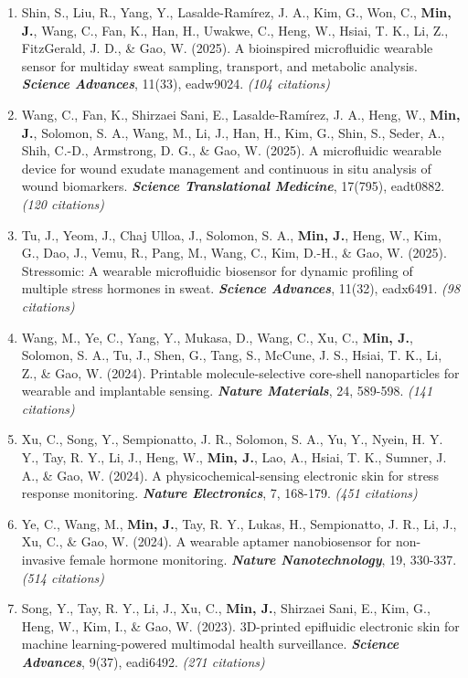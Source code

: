 \documentclass[11pt,a4paper]{article}
\begin{document}
\begin{enumerate}[leftmargin=*, itemsep=3pt, parsep=0pt, topsep=2pt]
  \item Shin, S., Liu, R., Yang, Y., Lasalde-Ramírez, J. A., Kim, G., Won, C., \textbf{Min, J.}, Wang, C., Fan, K., Han, H., Uwakwe, C., Heng, W., Hsiai, T. K., Li, Z., FitzGerald, J. D., \& Gao, W. (2025). A bioinspired microfluidic wearable sensor for multiday sweat sampling, transport, and metabolic analysis. \textbf{\textit{Science Advances}}, 11(33), eadw9024. \textit{(104 citations)}
  \item Wang, C., Fan, K., Shirzaei Sani, E., Lasalde-Ramírez, J. A., Heng, W., \textbf{Min, J.}, Solomon, S. A., Wang, M., Li, J., Han, H., Kim, G., Shin, S., Seder, A., Shih, C.-D., Armstrong, D. G., \& Gao, W. (2025). A microfluidic wearable device for wound exudate management and continuous in situ analysis of wound biomarkers. \textbf{\textit{Science Translational Medicine}}, 17(795), eadt0882. \textit{(120 citations)}
  \item Tu, J., Yeom, J., Chaj Ulloa, J., Solomon, S. A., \textbf{Min, J.}, Heng, W., Kim, G., Dao, J., Vemu, R., Pang, M., Wang, C., Kim, D.-H., \& Gao, W. (2025). Stressomic: A wearable microfluidic biosensor for dynamic profiling of multiple stress hormones in sweat. \textbf{\textit{Science Advances}}, 11(32), eadx6491. \textit{(98 citations)}
  \item Wang, M., Ye, C., Yang, Y., Mukasa, D., Wang, C., Xu, C., \textbf{Min, J.}, Solomon, S. A., Tu, J., Shen, G., Tang, S., McCune, J. S., Hsiai, T. K., Li, Z., \& Gao, W. (2024). Printable molecule-selective core-shell nanoparticles for wearable and implantable sensing. \textbf{\textit{Nature Materials}}, 24, 589-598. \textit{(141 citations)}
  \item Xu, C., Song, Y., Sempionatto, J. R., Solomon, S. A., Yu, Y., Nyein, H. Y. Y., Tay, R. Y., Li, J., Heng, W., \textbf{Min, J.}, Lao, A., Hsiai, T. K., Sumner, J. A., \& Gao, W. (2024). A physicochemical-sensing electronic skin for stress response monitoring. \textbf{\textit{Nature Electronics}}, 7, 168-179. \textit{(451 citations)}
  \item Ye, C., Wang, M., \textbf{Min, J.}, Tay, R. Y., Lukas, H., Sempionatto, J. R., Li, J., Xu, C., \& Gao, W. (2024). A wearable aptamer nanobiosensor for non-invasive female hormone monitoring. \textbf{\textit{Nature Nanotechnology}}, 19, 330-337. \textit{(514 citations)}
  \item Song, Y., Tay, R. Y., Li, J., Xu, C., \textbf{Min, J.}, Shirzaei Sani, E., Kim, G., Heng, W., Kim, I., \& Gao, W. (2023). 3D-printed epifluidic electronic skin for machine learning-powered multimodal health surveillance. \textbf{\textit{Science Advances}}, 9(37), eadi6492. \textit{(271 citations)}

\end{enumerate}
\end{document}
